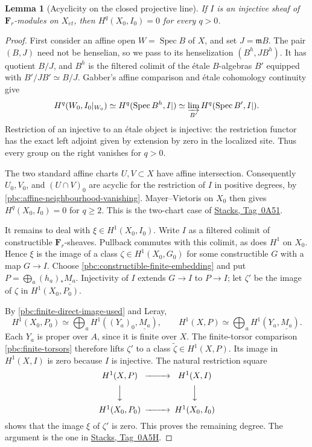 \documentclass[11pt,a4paper]{article}
\numberwithin{equation}{section}
\newtheorem{lemma}[theorem]{Lemma}
\theoremstyle{definition}
\theoremstyle{remark}
\newcommand{\et}{\acute{e}t}
\newcommand{\stacks}[1]{\href{https://stacks.math.columbia.edu/tag/#1}{\textnormal{Stacks, Tag~#1}}}
\begin{document}
\begin{lemma}[Acyclicity on the closed projective line]
\label{pbc:p1-injective-fibre}
If $I$ is an injective sheaf of $\mathbf F_r$-modules on $X_{\et}$,
then $H^q(X_0,I_0)=0$ for every $q>0$.
\end{lemma}
\begin{proof}
First consider an affine open $W=\operatorname{Spec}B$ of $X$, and set
$J=\mathfrak mB$. The pair $(B,J)$ need not be henselian, so we pass
to its henselization $(B^h,JB^h)$.  It has quotient $B/J$, and $B^h$ is the filtered colimit
of the \'etale $B$-algebras $B'$ equipped with
$B'/JB'\simeq B/J$.  Gabber's affine comparison and \'etale cohomology
continuity give
\begin{equation}
 H^q(W_0,I_0|_{W_0})
 \simeq H^q(\operatorname{Spec}B^h,I|)
 \simeq\varinjlim_{B'}H^q(\operatorname{Spec}B',I|).
 \label{pbc:affine-neighbourhood-vanishing}
\end{equation}
Restriction of an injective to an \'etale object is injective: the
restriction functor has the exact left adjoint given by extension by
zero in the localized site.  Thus every group on the right vanishes for
$q>0$.

The two standard affine charts $U,V\subset X$ have affine intersection.
Consequently $U_0,V_0$, and $(U\cap V)_0$ are acyclic for the
restriction of $I$ in positive degrees, by
\eqref{pbc:affine-neighbourhood-vanishing}.  Mayer--Vietoris on $X_0$
then gives $H^q(X_0,I_0)=0$ for $q\geq2$.  This is the two-chart
case of \stacks{0A51}.

It remains to deal with $\xi\in H^1(X_0,I_0)$.  Write $I$ as a filtered
colimit of constructible $\mathbf F_r$-sheaves.  Pullback commutes with
this colimit, as does $H^1$ on $X_0$.  Hence $\xi$ is the image of a
class $\zeta\in H^1(X_0,G_0)$ for some constructible $G$ with a map
$G\to I$.  Choose \eqref{pbc:constructible-finite-embedding} and put
$P=\bigoplus_a(h_a)_*\underline{M_a}$.  Injectivity of $I$ extends
$G\to I$ to $P\to I$; let $\zeta'$ be the image of $\zeta$ in
$H^1(X_0,P_0)$.

By \eqref{pbc:finite-direct-image-used} and Leray,
\[
 H^1(X_0,P_0)
 \simeq\bigoplus_a H^1((Y_a)_0,\underline{M_a}),\qquad
 H^1(X,P)\simeq\bigoplus_a H^1(Y_a,\underline{M_a}).
\]
Each $Y_a$ is proper over $A$, since it is finite over $X$.  The
finite-torsor comparison \eqref{pbc:finite-torsors} therefore lifts
$\zeta'$ to a class $\widetilde\zeta\in H^1(X,P)$.
Its image in $H^1(X,I)$ is zero because $I$ is injective.  The natural
restriction square
\[
 \begin{CD}
 H^1(X,P) @>>> H^1(X,I)\\
 @VVV @VVV\\
 H^1(X_0,P_0) @>>> H^1(X_0,I_0)
 \end{CD}
\]
shows that the image $\xi$ of $\zeta'$ is zero.  This proves the remaining
degree.  The argument is the one in \stacks{0A5H}.
\end{proof}
\end{document}
